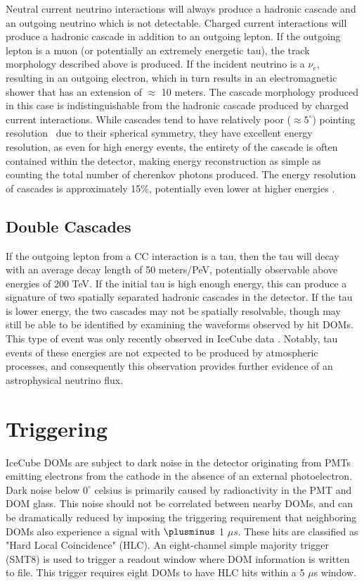Neutral current neutrino interactions will always produce a hadronic cascade and an outgoing neutrino which is not detectable. Charged current interactions will produce a hadronic cascade in addition to an outgoing lepton. If the outgoing lepton is a muon (or potentially an extremely energetic tau), the track morphology described above is produced. If the incident neutrino is a $\nu_e$, resulting in an outgoing electron, which in turn results in an electromagnetic shower that has an extension of $\approx$ 10 meters. The cascade morphology produced in this case is indistinguishable from the hadronic cascade produced by charged current interactions. While cascades tend to have relatively poor ($\approx 5^{\circ}$) pointing resolution~\cite{cascade_dnn_paper} due to their spherical symmetry, they have excellent energy resolution, as even for high energy events, the entirety of the cascade is often contained within the detector, making energy reconstruction as simple as counting the total number of cherenkov photons produced. The energy resolution of cascades is approximately 15\%, potentially even lower at higher energies \cite{AustinThesis}.


\subsection{Double Cascades}
If the outgoing lepton from a CC interaction is a tau, then the tau will decay with an average decay length of 50 meters/PeV, potentially observable above energies of 200 TeV. If the initial tau is high enough energy, this can produce a signature of two spatially separated hadronic cascades in the detector. If the tau is lower energy, the two cascades may not be spatially resolvable, though may still be able to be identified by examining the waveforms observed by hit DOMs. This type of event was only recently observed in IceCube data \cite{taupaper}. Notably, tau events of these energies are not expected to be produced by atmospheric processes, and consequently this observation provides further evidence of an astrophysical neutrino flux. 

\section{Triggering}
IceCube DOMs are subject to dark noise in the detector originating from PMTs emitting electrons from the cathode in the absence of an external photoelectron. Dark noise below $0^{\circ}$ celsius is primarily caused by radioactivity in the PMT and DOM glass. This noise should not be correlated between nearby DOMs, and can be dramatically reduced by imposing the triggering requirement that neighboring DOMs also experience a signal with $\plusminus$ 1 $\mu s$. These hits are classified as "Hard Local Coincidence" (HLC). An eight-channel simple majority trigger (SMT8) is used to trigger a readout window where DOM information is written to file. This trigger requires eight DOMs to have HLC hits within a 5 $\mu$s window. 

